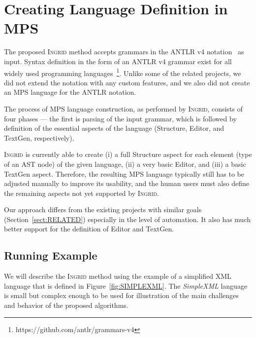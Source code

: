\section{Creating Language Definition in MPS}
\label{sect:LANGDEF}

The proposed \textsc{Ingrid} method accepts grammars in the ANTLR v4 notation~\cite{ref:ANTLRBOOK} as input.
Syntax definition in the form of an ANTLR v4 grammar exist for all widely used programming languages~\footnote{https://github.com/antlr/grammars-v4}.
Unlike some of the related projects, we did not extend the notation with any custom features, and we also did not create an MPS language for the ANTLR notation.

The process of MPS language construction, as performed by \textsc{Ingrid}, consists of four phases --- the first is parsing of the input grammar, which is followed by definition of the essential aspects of the language (Structure, Editor, and TextGen, respectively).

\textsc{Ingrid} is currently able to create (i) a full Structure aspect for each element (type of an AST node) of the given language, (ii) a very basic Editor, and (iii) a basic TextGen aspect.
Therefore, the resulting MPS language typically still has to be adjusted manually to improve its usability, and the human users must also define the remaining aspects not yet supported by \textsc{Ingrid}.

Our approach differs from the existing projects with similar goals (Section~\ref{sect:RELATED}) especially in the level of automation. It also has much better support for the definition of Editor and TextGen.

\subsection{Running Example}

We will describe the \textsc{Ingrid} method using the example of a simplified XML language that is defined in Figure~\ref{fig:SIMPLEXML}.
The \emph{SimpleXML} language is small but complex enough to be used for illustration of the main challenges and behavior of the proposed algorithms.

